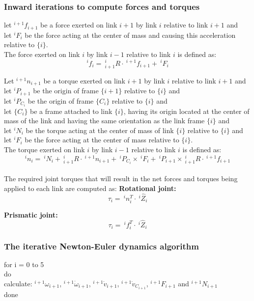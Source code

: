 \documentclass[10pt,a4paper]{article}
\newcommand{\tab}[1][1]{\hspace*{#1cm}}
\begin{document}
\subsubsection{Inward iterations to compute forces and torques}
let $^{i+1}f_{i+1}$ be a force exerted on link $i+1$ by link $i$ relative to link $i+1$ and \\
let $^iF_i$ be the force acting at the center of mass and causing this acceleration relative to $\{i\}$. \\
The force exerted on link $i$ by link $i-1$ relative to link $i$ is defined as:
$$
	^if_i = ~^i_{i+1}R ⋅ ~^{i+1}f_{i+1} + ~^iF_i
$$

Let $^{i+1}n_{i+1}$ be a torque exerted on link $i+1$ by link $i$ relative to link $i+1$ and \\
let $^iP_{i+1}$ be the origin of frame $\{i+1\}$ relative to $\{i\}$ and \\
let $^iP_{C_i}$ be the origin of frame $\{C_i\}$ relative to $\{i\}$ and \\
let $\{C_i\}$ be a frame attached to link $\{i\}$, having its origin located at the center of mass of the link and having the same orientation as the link frame $\{i\}$ and \\
let $^iN_i$ be the torque acting at the center of mass of link $\{i\}$ relative to $\{i\}$ and \\
let $^iF_i$ be the force acting at the center of mass relative to $\{i\}$. \\
The torque exerted on link $i$ by link $i-1$ relative to link $i$ is defined as:
$$
	^in_i = ~^iN_i + ~^i_{i+1}R ⋅ ~^{i+1}n_{i+1} + ~^iP_{C_i} \times ~^iF_i + ~^iP_{i+1} \times ~^i_{i+1}R ⋅ ~^{i+1}f_{i+1}
$$
\\

The required joint torques that will result in the net forces and torques being applied to each link are computed as:
\textbf{Rotational joint:} \\
$$
	\tau_i = ~^in_i^T ⋅ ~^i\hat{Z}_i
$$

\textbf{Prismatic joint:} \\
$$
	\tau_i = ~^if_i^T ⋅ ~^i\hat{Z}_i
$$

\subsubsection{The iterative Newton-Euler dynamics algorithm}
for i = 0 to 5 \\
do \\
\tab	calculate: $^{i+1}\omega_{i+1}$, $^{i+1}\dot \omega_{i+1}$, $^{i+1}\dot v_{i+1}$, $^{i+1}\dot v_{C_{i+1}}$, $^{i+1}F_{i+1}$ and $^{i+1}N_{i+1}$ \\
done \\
\end{document}
